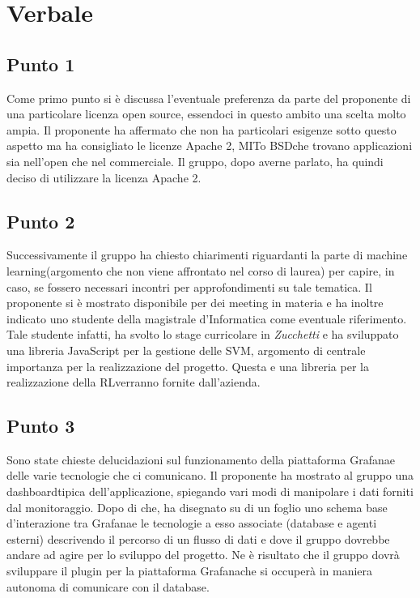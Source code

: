 \section{Verbale}
        \subsection{Punto 1}
            Come primo punto si è discussa l'eventuale preferenza da parte del proponente di una particolare licenza open source, essendoci in questo ambito una scelta molto ampia. Il proponente ha affermato che non ha particolari esigenze sotto questo aspetto ma ha consigliato le licenze Apache 2\glo, MIT\glosp o BSD\glosp che trovano applicazioni sia nell'open che nel commerciale. Il gruppo, dopo averne parlato, ha quindi deciso di utilizzare la licenza Apache 2\glo.
        \subsection{Punto 2}
            Successivamente il gruppo ha chiesto chiarimenti riguardanti la parte di machine learning\glosp (argomento che non viene affrontato nel corso di laurea) per capire, in caso, se fossero necessari incontri per approfondimenti su tale tematica. Il proponente si è mostrato disponibile per dei meeting in materia e ha inoltre indicato uno studente della magistrale d'Informatica come eventuale riferimento. Tale studente infatti, ha svolto lo stage curricolare in \textit{Zucchetti} e ha sviluppato una libreria JavaScript per la gestione delle SVM\glosp, argomento di centrale importanza per la realizzazione del progetto\glo. Questa e una libreria per la realizzazione della RL\glosp verranno fornite dall'azienda.
        \subsection{Punto 3}
            Sono state chieste delucidazioni sul funzionamento della piattaforma Grafana\glosp e delle varie tecnologie che ci comunicano. Il proponente ha mostrato al gruppo una dashboard\glosp tipica dell'applicazione, spiegando vari modi di manipolare i dati forniti dal monitoraggio. Dopo di che, ha disegnato su di un foglio uno schema base d'interazione tra Grafana\glosp e le tecnologie a esso associate (database e agenti esterni) descrivendo il percorso di un flusso di dati e dove il gruppo dovrebbe andare ad agire per lo sviluppo del progetto\glo. Ne è risultato che il gruppo dovrà sviluppare il plugin per la piattaforma Grafana\glosp che si occuperà in maniera autonoma di comunicare con il database.
